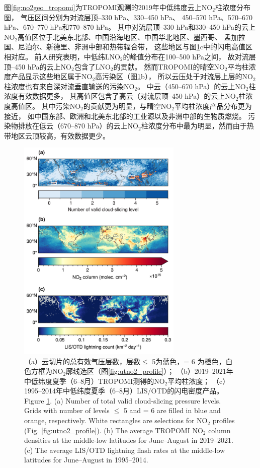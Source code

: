 图\ref{fig:no2geo_tropomi}为TROPOMI观测的2019年中低纬度云上NO$_2$柱浓度分布图，
气压区间分别为对流层顶--330 hPa、330--450 hPa、
450--570 hPa、570--670 hPa、670--770 hPa和770--870 hPa。
其中对流层顶--330 hPa和330--450 hPa的云上NO$_2$高值区位于北美东北部、中国沿海地区、中国华北地区、墨西哥、
孟加拉国、尼泊尔、新德里、非洲中部和热带辐合带，
这些地区与图\ref{fig:no2_ltngcount}c中的闪电高值区相对应。
前人研究表明，中低纬LNO$_2$的峰值分布在100--500 hPa之间\citep{Pickering.1988,Ott.2010,Luo.2017}，
故对流层顶--450 hPa的云上NO$_2$包含了LNO$_2$的贡献。
然而TROPOMI的晴空NO$_2$平均柱浓度产品显示这些地区属于NO$_2$高污染区（图\ref{fig:no2_ltngcount}b），
所以云压处于对流层上层的NO$_2$柱浓度也有来自深对流垂直输送的污染NO$_2$。
中云（450--670 hPa）的云上NO$_2$柱浓度有效数据更多，
其高值区包含了高云（对流层顶--450 hPa）的云上NO$_2$柱浓度高值区。
其中污染NO$_2$的贡献更为明显，与晴空NO$_2$平均柱浓度产品分布更为接近，
如中国东部、欧洲和北美东北部的工业源以及非洲中部的生物质燃烧。
污染物排放在低云（670--870 hPa）的云上NO$_2$柱浓度分布中最为明显，然而由于热带地区云顶较高，有效数据更少。


\begin{figure}[H]
    \centering
    \includegraphics[width=0.7\textwidth]{./figures/no2_ltngcount.png}
    \caption{
    （a）云切片的总有效气压层数，层数$\leq$ 5为蓝色，= 6 为橙色，白色方框为NO$_2$廓线选区（图\ref{fig:utno2_profile}）；
    （b）2019--2021年中低纬度夏季（6--8月）TROPOMI测得的NO$_2$平均柱浓度；
    （c）1995--2014年中低纬度夏季（6--8月）LIS/OTD的闪电密度产品。 \\
    Figure \ref{fig:no2_ltngcount}. (a) Number of total valid cloud-slicing pressure levels.
    Grids with number of levels $\leq$ 5 and = 6 are filled in blue and orange, respectively.
    White rectangles are selections for NO$_2$ profiles (Fig. \ref{fig:utno2_profile}).
    (b) The average TROPOMI NO$_2$ column densities at the middle-low latitudes for June--August in 2019--2021.
    (c) The average LIS/OTD lightning flash rates at the middle-low latitudes for June--August in 1995--2014.
    }
    \label{fig:no2_ltngcount}
\end{figure}

